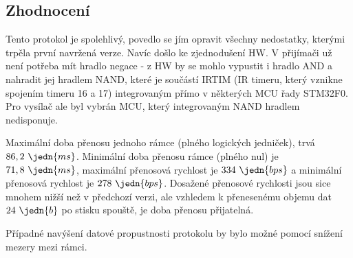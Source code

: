 \subsection{Zhodnocení}
Tento protokol je spolehlivý, povedlo se jím opravit všechny nedostatky, kterými trpěla první navržená verze. Navíc došlo ke zjednodušení HW. V přijímači už není potřeba mít hradlo negace - z HW by se mohlo vypustit i hradlo AND a nahradit jej hradlem NAND, které je součástí IRTIM (IR timeru, který vznikne spojením timeru 16 a 17) integrovaným přímo v některých MCU řady STM32F0. Pro vysílač ale byl vybrán MCU, který integrovaným NAND hradlem nedisponuje.

Maximální doba přenosu jednoho rámce (plného logických jedniček), trvá $86,2~\jedn{ms}$. Minimální doba přenosu rámce (plného nul) je $71,8~\jedn{ms}$, maximální přenosová rychlost je $334~\jedn{bps}$ a minimální přenosová rychlost je $278~\jedn{bps}$. Dosažené přenosové rychlosti jsou sice mnohem nižší než v předchozí verzi, ale vzhledem k přenesenému objemu dat $24~\jedn{b}$ po stisku spouště, je doba přenosu přijatelná.

Případné navýšení datové propustnosti protokolu by bylo možné pomocí snížení mezery mezi rámci.

